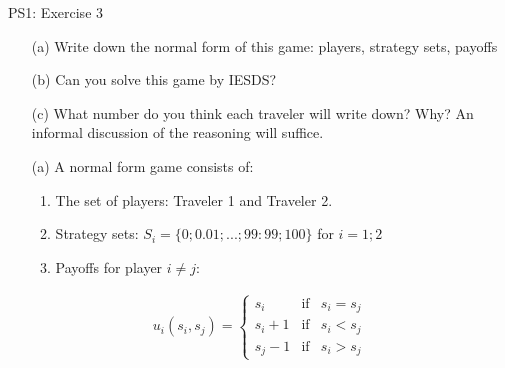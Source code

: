 \begin{frame}{PS1: Exercise 3}
\begin{multicols}{2}
  \begin{itemize}
    \item[(a)] Write down the normal form of this game: players, strategy sets, payoffs
  \item[(b)] Can you solve this game by IESDS?
  \item[(c)] What number do you think each traveler will write down? Why? An informal
  discussion of the reasoning will suffice.
  \end{itemize}
\vfill\null \columnbreak
\begin{itemize}
  \item[(a)] A normal form game consists of:
    \begin{enumerate}
      \item The set of players: Traveler 1 and Traveler 2.
      \item Strategy sets: $S_i = \{0; 0.01; ... ; 99:99; 100\}$ for $i = 1; 2$
      \item Payoffs for player $i\neq j$:
    \end{enumerate}
\end{itemize}
\begin{align*}
  u_i(s_i,s_j)=
  \left\{ \begin{array}{ccl}
  s_i   & \mbox{if} & s_i=s_j \\
  s_i+1 & \mbox{if} & s_i<s_j \\
  s_j-1 & \mbox{if} & s_i>s_j
  \end{array}\right.
\end{align*}
\vfill\null
\end{multicols}
\end{frame}

